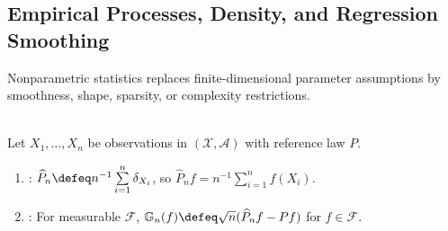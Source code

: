 \subsection{Empirical Processes, Density, and Regression Smoothing}

Nonparametric statistics replaces finite-dimensional parameter assumptions by smoothness, shape, sparsity, or complexity restrictions.

\begin{definition} \label{def:empirical-measure-and-process} \\
Let $X_1,\ldots,X_n$ be observations in $(\mathcal{X},\mathcal{A})$ with reference law $P$.
\begin{enumerate}[label=(\roman*)]
\setlength{\itemsep}{0pt}
\item {}: $\widehat{P}_n\defeq n^{-1}\sum\limits_{i=1}^n\delta_{X_i}$, so $\widehat{P}_nf=n^{-1}\sum\limits_{i=1}^nf(X_i)$.
\item {}: For measurable $\mathcal{F}$, $\mathbb{G}_n(f)\defeq\sqrt{n}(\widehat{P}_nf-Pf)$ for $f\in\mathcal{F}$.
\end{enumerate}
\end{definition}

